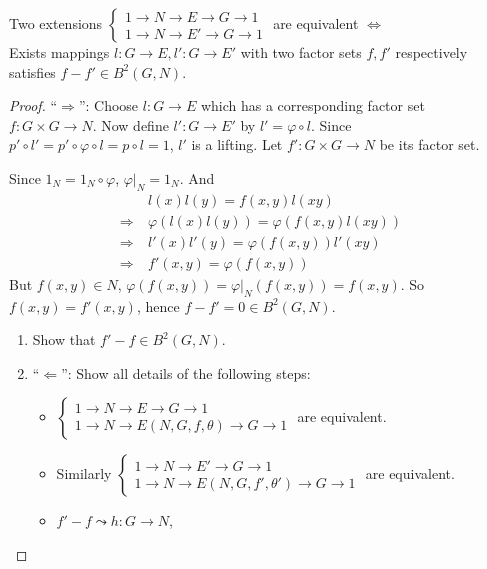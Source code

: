 \begin{theorem}
  Two extensions $\begin{cases}
    1\to N\to E\to G\to 1 \\
    1\to N\to E'\to G\to 1
  \end{cases}$ are equivalent $\iff$ \\
  Exists mappings $l: G\to E, l': G\to E'$ with two factor sets $f, f'$ respectively satisfies
  $f - f' \in B^2(G, N)$.

  \begin{proof}
    ``$\Rightarrow$'': Choose $l: G\to E$ which has a corresponding factor set $f: G\times G \to N$.
    Now define $l': G\to E'$ by $l' = \varphi \circ l$. Since 
    $p' \circ l' = p' \circ \varphi \circ l = p \circ l = 1$, $l'$ is a lifting.
    Let   $f': G\times G \to N$ be its factor set.
    
    Since $1_N = 1_N \circ \varphi$, $\varphi \big|_N = 1_N$. And
    \begin{align*}
      & l(x) l(y) = f(x, y) l(xy) \\
      \Rightarrow \ & \varphi(l(x) l(y)) = \varphi(f(x, y) l(xy)) \\
      \Rightarrow \ & l'(x) l'(y) = \varphi(f(x, y)) l'(xy) \\
      \Rightarrow \ & f'(x, y) = \varphi(f(x, y))
    \end{align*}
    But $f(x, y) \in N$, $\varphi(f(x, y)) = \varphi\big|_N(f(x, y)) = f(x, y)$. So $f(x, y) = f'(x, y)$,
    hence $f - f' = 0 \in B^2(G, N)$.
    \begin{exercise} \mbox{}
      \begin{enumerate}[(1)]
        \item Show that $f' - f \in B^2(G, N)$.
        \item ``$\Leftarrow$'': Show all details of the following steps:
          \begin{itemize}
            \item $\begin{cases}
                1\to N\to E \to G \to 1 \\
                1\to N\to E(N, G, f, \theta) \to G\to 1
              \end{cases}$ are equivalent.
            \item Similarly $\begin{cases}
                1\to N\to E' \to G\to 1 \\
                1\to N\to E(N, G, f', \theta')\to G\to 1
              \end{cases}$ are equivalent.
            \item $f'-f \leadsto h:G\to N$,
          \end{itemize}
          \qedhere
      \end{enumerate}
    \end{exercise}
  \end{proof}
\end{theorem}

